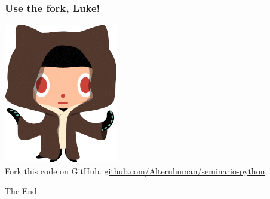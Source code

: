 \documentclass{beamer}
\begin{document}
\begin{frame}
\frametitle{Use the fork, Luke!}
\begin{center}
\includegraphics[height=0.5\textheight]{octocat.png}\\
Fork this code on GitHub.
\href{https://github.com/Alternhuman/seminario-python}{github.com/Alternhuman/seminario-python}
\end{center}
\end{frame}
\begin{frame}
\Huge{\centerline{The End}}
\end{frame}

\end{document}
